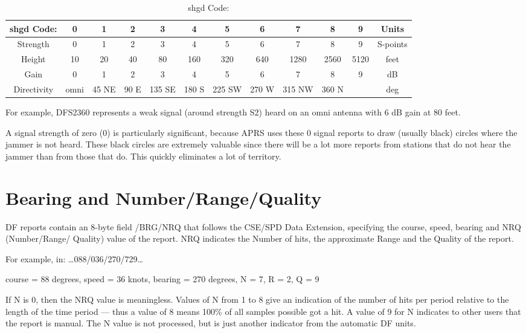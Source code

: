 \begin{table}
  \caption {shgd Code:}
  \begin{tabular}{|c|c|c|c|c|c|c|c|c|c|c|c|}
    \hline      
    shgd Code: & 0 & 1 & 2 & 3 & 4 & 5 & 6 & 7 & 8 & 9 & Units \\
    \hline  
    Strength & 0 & 1 & 2 & 3 & 4 & 5 & 6 & 7 & 8 & 9 & S-points \\
    \hline  
    Height & 10 & 20 & 40 & 80 & 160 & 320 & 640 & 1280 & 2560 & 5120 & feet \\
    \hline  
    Gain & 0 & 1 & 2 & 3 & 4 & 5 & 6 & 7 & 8 & 9 & dB \\
    \hline  
    Directivity & omni & 45 NE & 90 E & 135 SE & 180 S & 225 SW & 270 W & 315 NW & 360 N & & deg \\
    \hline  
  \end{tabular}
\end{table}


For example, DFS2360 represents a weak signal (around strength S2) heard
on an omni antenna with 6 dB gain at 80 feet.

A signal strength of zero (0) is particularly significant, because APRS uses
these 0 signal reports to draw (usually black) circles where the jammer is not
heard. These black circles are extremely valuable since there will be a lot
more reports from stations that do not hear the jammer than from those that
do. This quickly eliminates a lot of territory.

\section {Bearing and Number/Range/Quality}

DF reports contain an 8-byte field /BRG/NRQ that follows the CSE/SPD Data
Extension, specifying the course, speed, bearing and NRQ (Number/Range/
Quality) value of the report. NRQ indicates the Number of hits, the
approximate Range and the Quality of the report.

For example, in:
…088/036/270/729…

course = 88 degrees, speed = 36 knots,
bearing = 270 degrees, N = 7, R = 2, Q = 9

If N is 0, then the NRQ value is meaningless. Values of N from 1 to 8 give an
indication of the number of hits per period relative to the length of the time
period — thus a value of 8 means 100\% of all samples possible got a hit. A
value of 9 for N indicates to other users that the report is manual.
The N value is not processed, but is just another indicator from the automatic
DF units.

